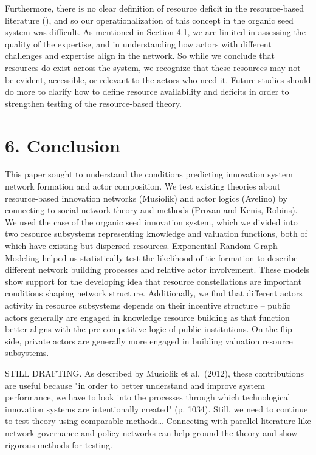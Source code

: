 \documentclass[twoside,12pt,final]{ucthesis-CA2012}
\begin{document}
\begin{ucmainmatter}
Furthermore, there is no clear definition of resource deficit in the
resource-based literature (), and so our operationalization of this
concept in the organic seed system was difficult. As mentioned in
Section 4.1, we are limited in assessing the quality of the expertise,
and in understanding how actors with different challenges and expertise
align in the network. So while we conclude that resources do exist
across the system, we recognize that these resources may not be evident,
accessible, or relevant to the actors who need it. Future studies should
do more to clarify how to define resource availability and deficits in
order to strengthen testing of the resource-based theory.

\hypertarget{conclusion}{%
\section{6. Conclusion}\label{conclusion}}

This paper sought to understand the conditions predicting innovation
system network formation and actor composition. We test existing
theories about resource-based innovation networks (Musiolik) and actor
logics (Avelino) by connecting to social network theory and methods
(Provan and Kenis, Robins). We used the case of the organic seed
innovation system, which we divided into two resource subsystems
representing knowledge and valuation functions, both of which have
existing but dispersed resources. Exponential Random Graph Modeling
helped us statistically test the likelihood of tie formation to describe
different network building processes and relative actor involvement.
These models show support for the developing idea that resource
constellations are important conditions shaping network structure.
Additionally, we find that different actors\textquotesingle{} activity in resource
subsystems depends on their incentive structure -- public actors
generally are engaged in knowledge resource building as that function
better aligns with the pre-competitive logic of public institutions. On
the flip side, private actors are generally more engaged in building
valuation resource subsystems.

STILL DRAFTING. As described by Musiolik et al.~(2012), these
contributions are useful because "in order to better understand and
improve system performance, we have to look into the processes through
which technological innovation systems are intentionally created" (p.
1034). Still, we need to continue to test theory using comparable
methods\ldots{} Connecting with parallel literature like network governance
and policy networks can help ground the theory and show rigorous methods
for testing.


\end{ucmainmatter}
\end{document}
